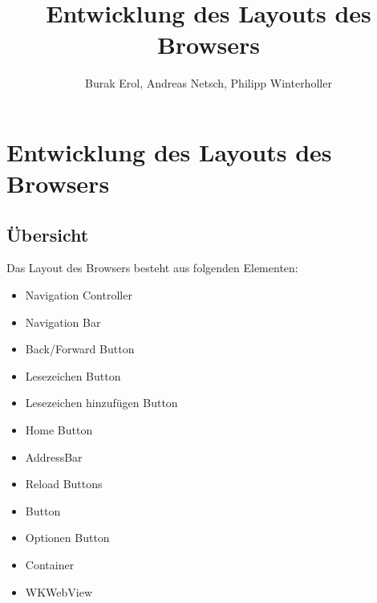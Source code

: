 
\title{Entwicklung des Layouts des Browsers}
\author{Burak Erol, Andreas Netsch, Philipp Winterholler}

\chapter{Entwicklung des Layouts des Browsers}

\section{Übersicht}

Das Layout des Browsers besteht aus folgenden Elementen:

\begin{itemize}
\item Navigation Controller
\item Navigation Bar
\item Back/Forward Button
\item Lesezeichen Button
\item Lesezeichen hinzufügen Button
\item Home Button
\item AddressBar
\item Reload Buttons
\item \SECH Button
\item Optionen Button
\item Container
\item WKWebView
\end{itemize}


